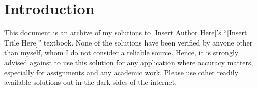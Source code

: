 \section{Introduction}

This document is an archive of my solutions to [Insert Author Here]'s ``[Insert Title Here]'' textbook.
None of the solutions have been verified by anyone other than myself, whom I do not consider a reliable source.
Hence, it is strongly advised against to use this solution for any application where accuracy matters,
especially for assignments and any academic work.
Please use other readily available solutions out in the dark sides of the internet.
